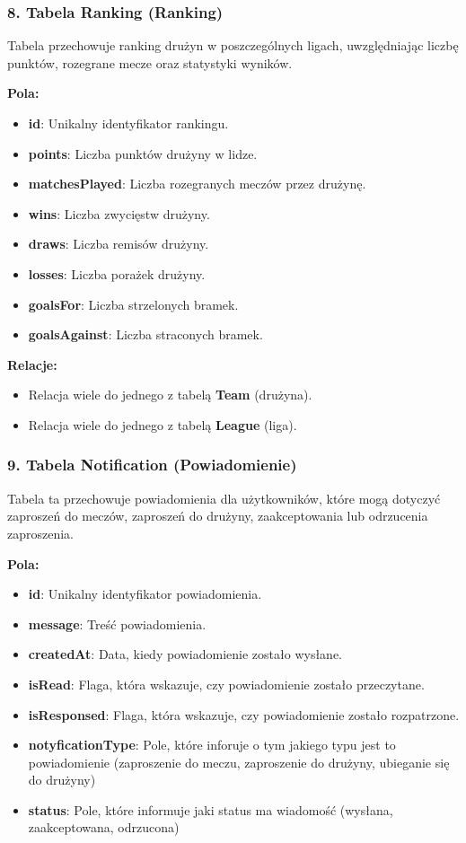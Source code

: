 \documentclass[wmii,inf,inz]{uwmthesis} %
\newenvironment{indenteditemize}
{\begin{itemize}[left=1cm]} %
{\end{itemize}}
\begin{document}
\subsubsection{8. Tabela Ranking (Ranking)}
Tabela przechowuje ranking drużyn w poszczególnych ligach, uwzględniając liczbę punktów, rozegrane mecze oraz statystyki wyników.

\textbf{Pola:}
\begin{indenteditemize}
    \item \textbf{id}: Unikalny identyfikator rankingu.
    \item \textbf{points}: Liczba punktów drużyny w lidze.
    \item \textbf{matchesPlayed}: Liczba rozegranych meczów przez drużynę.
    \item \textbf{wins}: Liczba zwycięstw drużyny.
    \item \textbf{draws}: Liczba remisów drużyny.
    \item \textbf{losses}: Liczba porażek drużyny.
    \item \textbf{goalsFor}: Liczba strzelonych bramek.
    \item \textbf{goalsAgainst}: Liczba straconych bramek.
\end{indenteditemize}

\textbf{Relacje:}
\begin{indenteditemize}
    \item Relacja wiele do jednego z tabelą \textbf{Team} (drużyna).
    \item Relacja wiele do jednego z tabelą \textbf{League} (liga).
\end{indenteditemize}
\subsubsection{9. Tabela Notification (Powiadomienie)}
Tabela ta przechowuje powiadomienia dla użytkowników, które mogą dotyczyć zaproszeń do meczów, zaproszeń do drużyny, zaakceptowania lub odrzucenia zaproszenia.

\textbf{Pola:}
\begin{indenteditemize}
    \item \textbf{id}: Unikalny identyfikator powiadomienia.
    \item \textbf{message}: Treść powiadomienia.
    \item \textbf{createdAt}: Data, kiedy powiadomienie zostało wysłane.
    \item \textbf{isRead}: Flaga, która wskazuje, czy powiadomienie zostało przeczytane.
    \item \textbf{isResponsed}: Flaga, która wskazuje, czy powiadomienie zostało rozpatrzone.
    \item \textbf{notyficationType}:  Pole, które inforuje o tym jakiego typu jest to powiadomienie (zaproszenie do meczu, zaproszenie do drużyny, ubieganie się do drużyny)
    \item \textbf{status}: Pole, które informuje jaki status ma wiadomość (wysłana, zaakceptowana, odrzucona)
    
\end{indenteditemize}
\end{document}
